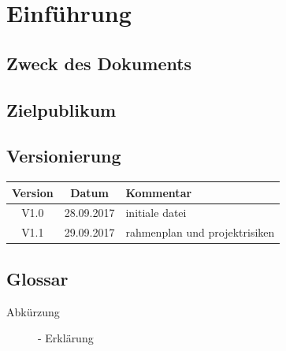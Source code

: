 \documentclass[a4paper, 10pt, fleqn]{article}
\begin{document}
	\begin{titlepage}
		\titleGM
		\thispagestyle{empty}
	\end{titlepage}
	
	\tableofcontents
	\listoffigures
	\listoftables
	
	\clearpage
	\section{Einführung}
		\subsection{Zweck des Dokuments}
		\subsection{Zielpublikum}
		\subsection{Versionierung}
			\begin{table}[h]
				\centering
				\begin{tabularx}{\textwidth}{|c|c|X|}
				\hline
				\rowcolor{shadecolor}\textbf{Version} & \textbf{Datum} & \textbf{Kommentar}\\ \hline
				V1.0 & 28.09.2017 & initiale datei \\ \hline
                V1.1 & 29.09.2017 & rahmenplan und projektrisiken\\
				\end{tabularx}
			\end{table}
		\subsection{Glossar}
			\begin{description}
				\item[Abkürzung]- Erklärung
			\end{description}

\end{document}
